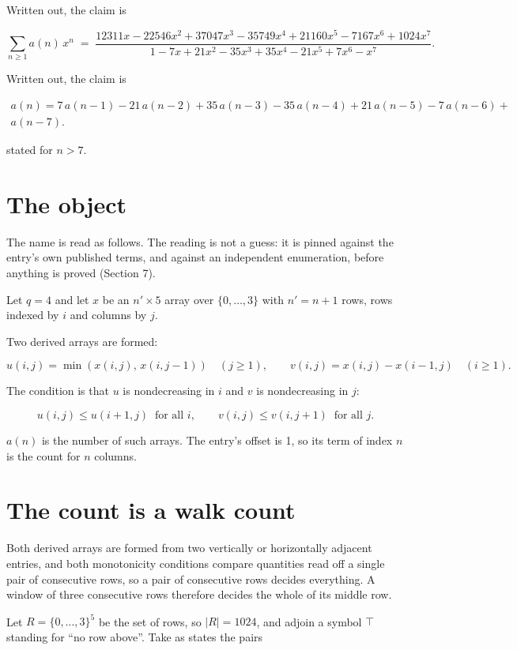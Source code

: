 \documentclass[11pt]{article}
\theoremstyle{definition}
\begin{document}
Written out, the claim is

\[\sum_{n \ge 1} a(n)\,x^n \;=\; \frac{12311x - 22546x^{2} + 37047x^{3} - 35749x^{4} + 21160x^{5} - 7167x^{6} + 1024x^{7}}{1 - 7x + 21x^{2} - 35x^{3} + 35x^{4} - 21x^{5} + 7x^{6} - x^{7}}.\]

Written out, the claim is

\begin{multline*} a(n) = 7\,a(n-1) - 21\,a(n-2) + 35\,a(n-3) - 35\,a(n-4) + 21\,a(n-5) - 7\,a(n-6) + \\ a(n-7). \end{multline*}

stated for $n > 7$.

\section{The object}

The name is read as follows. The reading is not a guess: it is pinned against the entry's own published terms, and against an independent enumeration, before anything is proved (Section 7).

Let $q = 4$ and let $x$ be an $n' \times 5$ array over $\{0,\dots,3\}$ with $n' = n + 1$ rows, rows indexed by $i$ and columns by $j$.

Two derived arrays are formed:

\[u(i,j) = \min(x(i,j),\,x(i,j{-}1))\quad (j \ge 1), \qquad v(i,j) = x(i,j) - x(i{-}1,j)\quad (i \ge 1).\]

The condition is that $u$ is nondecreasing in $i$ and $v$ is nondecreasing in $j$:

\[u(i,j) \le u(i{+}1,j) \ \text{ for all } i, \qquad v(i,j) \le v(i,j{+}1) \ \text{ for all } j.\]

$a(n)$ is the number of such arrays. The entry's offset is 1, so its term of index $n$ is the count for $n$ columns.

\section{The count is a walk count}

Both derived arrays are formed from two vertically or horizontally adjacent entries, and both monotonicity conditions compare quantities read off a single pair of consecutive rows, so a pair of consecutive rows decides everything. A window of three consecutive rows therefore decides the whole of its middle row.

Let $R = \{0,\dots,3\}^{5}$ be the set of rows, so $|R| = 1024$, and adjoin a symbol $\top$ standing for ``no row above''. Take as states the pairs
\end{document}

